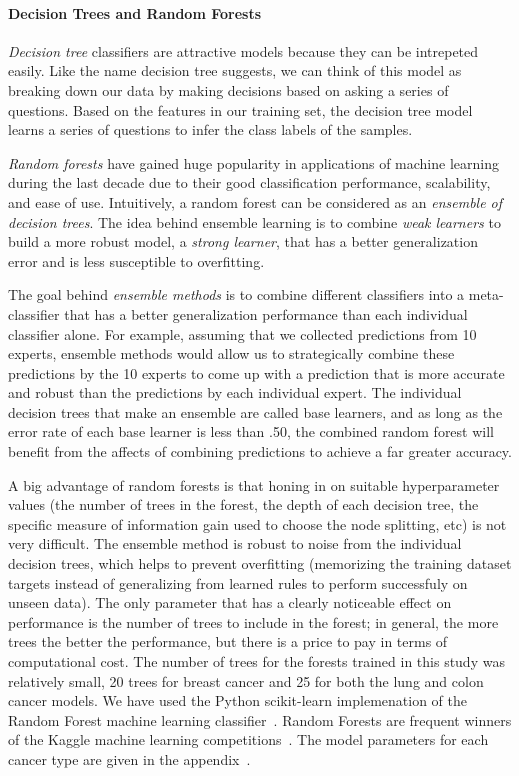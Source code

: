 \documentclass[10pt,letterpaper]{article}
\begin{document}
\paragraph{Decision Trees and Random Forests}
\emph{Decision tree} classifiers are attractive models because they can be intrepeted easily. Like the name decision tree suggests, we can think of this model as breaking down our data by making decisions based on asking a series of questions.
Based on the features in our training set, the decision tree model learns a series of questions to infer the class labels of the samples. 

\emph{Random forests} have gained huge popularity in applications of machine learning during the last decade due to their good classification performance, scalability, and ease of use. Intuitively, a random forest can be considered as an \emph{ensemble of decision trees}. The idea behind ensemble learning is to combine \emph{weak learners} to build a more robust model, a \emph{strong learner}, that has a better generalization error and is less susceptible to overfitting. 

The goal behind \emph{ensemble methods} is to combine different classifiers into a meta-classifier that has a better generalization performance than each individual classifier alone. For example, assuming that we collected predictions from 10 experts, ensemble methods would allow us to strategically combine these predictions by the 10 experts to come up with a prediction that is more accurate and robust than the predictions by each individual expert. The individual decision trees that make an ensemble are called base learners, and as long as the error rate of each base learner is less than .50, the combined random forest will benefit from the affects of combining predictions to achieve a far greater accuracy.







A big advantage of random forests is that honing in on suitable hyperparameter values (the number of trees in the forest, the depth of each decision tree, the specific measure of information gain used to choose the node splitting, etc) is not very difficult. The ensemble method is robust to noise from the individual decision trees, which helps to prevent overfitting (memorizing the training dataset targets instead of generalizing from learned rules to perform successfuly on unseen data). The only parameter that has a clearly noticeable effect on performance is the number of trees to include in the forest; in general, the more trees the better the performance, but there is a price to pay in terms of computational cost. The number of trees for the forests trained in this study was relatively small, 20 trees for breast cancer and 25 for both the lung and colon cancer models. We have used the Python scikit-learn implemenation of the Random Forest machine 
learning classifier~\cite{rf}.
Random Forests are frequent winners of the Kaggle machine learning competitions~\cite{kagglerf}.
The model parameters for each cancer type are given in the appendix~.
\end{document}
